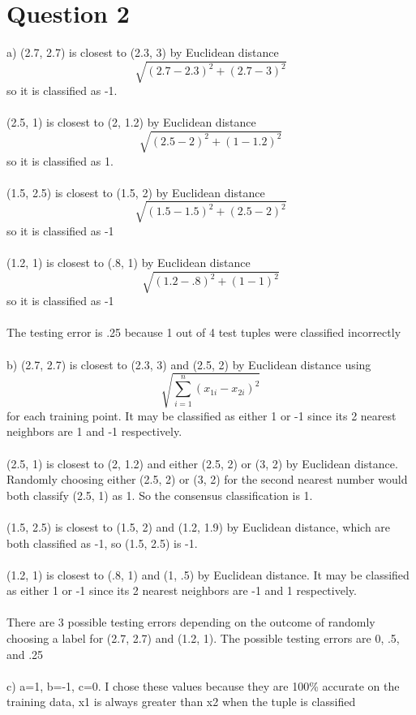 \documentclass{article}
\begin{document}
\section{Question 2}
a) (2.7, 2.7) is closest to (2.3, 3) by Euclidean distance $$\sqrt{(2.7-2.3)^2 + (2.7-3)^2}$$ so it is classified as -1.\\\\
(2.5, 1) is closest to (2, 1.2) by Euclidean distance $$\sqrt{(2.5-2)^2 + (1-1.2)^2}$$ so it is classified as 1.\\\\
(1.5, 2.5) is closest to (1.5, 2) by Euclidean distance $$\sqrt{(1.5-1.5)^2 + (2.5-2)^2}$$ so it is classified as -1\\\\
(1.2, 1) is closest to (.8, 1) by Euclidean distance $$\sqrt{(1.2-.8)^2 + (1-1)^2}$$ so it is classified as -1\\\\
The testing error is .25 because 1 out of 4 test tuples were classified incorrectly\\\\
b) (2.7, 2.7) is closest to (2.3, 3) and (2.5, 2) by Euclidean distance using $$\sqrt{\sum\limits_{i=1}^{n}{(x_{1i}-x_{2i})^2}}$$ for each training 
point.  It may be classified as either 1 or -1 since its 2 nearest neighbors are 1 and -1 respectively.\\\\
(2.5, 1) is closest to (2, 1.2) and either (2.5, 2) or (3, 2) by Euclidean distance.  Randomly choosing either (2.5, 2) or (3, 2) for the second
nearest number would both classify (2.5, 1) as 1.  So the consensus classification is 1.\\\\
(1.5, 2.5) is closest to (1.5, 2) and (1.2, 1.9) by Euclidean distance, which are both classified as -1, so (1.5, 2.5) is -1.\\\\
(1.2, 1) is closest to (.8, 1) and (1, .5) by Euclidean distance.  It may be classified as either 1 or -1 
since its 2 nearest neighbors are -1 and 1 respectively.\\\\
There are 3 possible testing errors depending on the outcome of randomly choosing a label for (2.7, 2.7) and (1.2, 1).  The possible testing
errors are 0, .5, and .25\\\\
c) a=1, b=-1, c=0.  I chose these values because they are 100\% accurate on the training data, x1 is always greater than x2 when the tuple is classified
\end{document}
